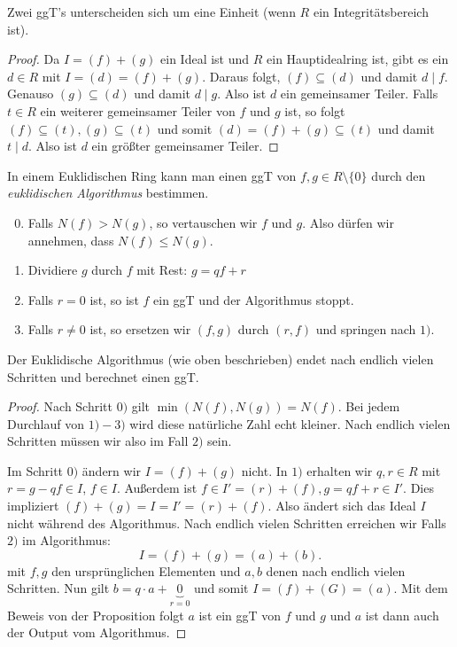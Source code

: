\begin{remark}
	Zwei ggT's unterscheiden sich um eine Einheit (wenn $R$ ein Integritätsbereich ist).
\end{remark}

\begin{proof}
	Da $I = (f) + (g)$ ein Ideal ist und $R$ ein Hauptidealring ist, gibt es ein $d \in R$ mit $I = (d) = (f) + (g)$.
	Daraus folgt, $(f) \subseteq (d)$ und damit $d \mid f$. Genauso $(g) \subseteq (d)$ und damit $d \mid g$.
	Also ist $d$ ein gemeinsamer Teiler.
	Falls $t \in R$ ein weiterer gemeinsamer Teiler von $f$ und $g$ ist, so folgt $(f) \subseteq (t), (g) \subseteq (t)$ und somit
	$(d) = (f) + (g) \subseteq (t)$ und damit $t \mid d$.
	Also ist $d$ ein größter gemeinsamer Teiler.
\end{proof}

In einem Euklidischen Ring kann man einen ggT von $f,g \in R \setminus \{0\} $ durch den \emph{euklidischen Algorithmus} bestimmen.
\begin{enumerate}[1)]
	\setcounter{enumi}{-1}
	\item Falls $N(f) > N(g)$, so vertauschen wir $f$ und $g$. 
		Also dürfen wir annehmen, dass $N(f) \leq N(g)$.
	\item Dividiere $g$ durch $f$ mit Rest: $g = q f + r$
	\item Falls $r = 0$ ist, so ist $f$ ein ggT und der Algorithmus stoppt.
	\item Falls $r\neq 0$ ist, so ersetzen wir $(f,g)$ durch $(r,f)$ und springen nach $1)$.
\end{enumerate}

\begin{lemma}
	Der Euklidische Algorithmus (wie oben beschrieben) endet nach endlich vielen Schritten und berechnet einen ggT.
\end{lemma}

\begin{proof}
	Nach Schritt $0)$ gilt $\min(N(f), N(g)) = N(f)$. 
	Bei jedem Durchlauf von $1)-3)$ wird diese natürliche Zahl echt kleiner.
	Nach endlich vielen Schritten müssen wir also im Fall $2)$ sein.

	Im Schritt $0)$ ändern wir $I = (f) + (g)$ nicht.
	In $1)$ erhalten wir $q,r \in R$ mit $r = g- qf \in I$, $f \in I$.
	Außerdem ist $f \in I' = (r) + (f), g = qf + r \in I'$.
	Dies impliziert $(f) + (g) = I = I' = (r)+(f)$.
	Also ändert sich das Ideal $I$ nicht während des Algorithmus.
	Nach endlich vielen Schritten erreichen wir Falls $2)$ im Algorithmus:
	\[
		I = (f) + (g) = (a) + (b)
	.\] 
	mit $f,g$ den ursprünglichen Elementen und $a,b$ denen nach endlich vielen Schritten.
	Nun gilt $b = q \cdot a + \underbrace{0}_{r=0}$ und somit $I = (f) + (G) = (a)$.
	Mit dem Beweis von der Proposition folgt $a$ ist ein ggT von $f$ und $g$ und $a$ ist dann auch der Output vom Algorithmus.
\end{proof}

